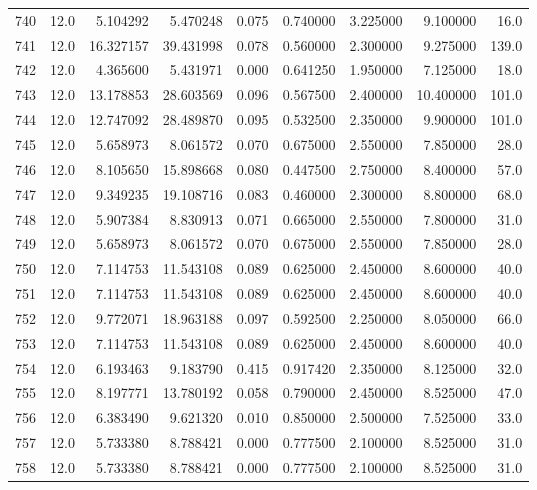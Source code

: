 \begin{tabular}{lrrrrrrrr}
740  &   12.0 &   5.104292 &   5.470248 &  0.075 &  0.740000 &  3.225000 &   9.100000 &   16.0 \\
741  &   12.0 &  16.327157 &  39.431998 &  0.078 &  0.560000 &  2.300000 &   9.275000 &  139.0 \\
742  &   12.0 &   4.365600 &   5.431971 &  0.000 &  0.641250 &  1.950000 &   7.125000 &   18.0 \\
743  &   12.0 &  13.178853 &  28.603569 &  0.096 &  0.567500 &  2.400000 &  10.400000 &  101.0 \\
744  &   12.0 &  12.747092 &  28.489870 &  0.095 &  0.532500 &  2.350000 &   9.900000 &  101.0 \\
745  &   12.0 &   5.658973 &   8.061572 &  0.070 &  0.675000 &  2.550000 &   7.850000 &   28.0 \\
746  &   12.0 &   8.105650 &  15.898668 &  0.080 &  0.447500 &  2.750000 &   8.400000 &   57.0 \\
747  &   12.0 &   9.349235 &  19.108716 &  0.083 &  0.460000 &  2.300000 &   8.800000 &   68.0 \\
748  &   12.0 &   5.907384 &   8.830913 &  0.071 &  0.665000 &  2.550000 &   7.800000 &   31.0 \\
749  &   12.0 &   5.658973 &   8.061572 &  0.070 &  0.675000 &  2.550000 &   7.850000 &   28.0 \\
750  &   12.0 &   7.114753 &  11.543108 &  0.089 &  0.625000 &  2.450000 &   8.600000 &   40.0 \\
751  &   12.0 &   7.114753 &  11.543108 &  0.089 &  0.625000 &  2.450000 &   8.600000 &   40.0 \\
752  &   12.0 &   9.772071 &  18.963188 &  0.097 &  0.592500 &  2.250000 &   8.050000 &   66.0 \\
753  &   12.0 &   7.114753 &  11.543108 &  0.089 &  0.625000 &  2.450000 &   8.600000 &   40.0 \\
754  &   12.0 &   6.193463 &   9.183790 &  0.415 &  0.917420 &  2.350000 &   8.125000 &   32.0 \\
755  &   12.0 &   8.197771 &  13.780192 &  0.058 &  0.790000 &  2.450000 &   8.525000 &   47.0 \\
756  &   12.0 &   6.383490 &   9.621320 &  0.010 &  0.850000 &  2.500000 &   7.525000 &   33.0 \\
757  &   12.0 &   5.733380 &   8.788421 &  0.000 &  0.777500 &  2.100000 &   8.525000 &   31.0 \\
758  &   12.0 &   5.733380 &   8.788421 &  0.000 &  0.777500 &  2.100000 &   8.525000 &   31.0 \\

\end{tabular}
